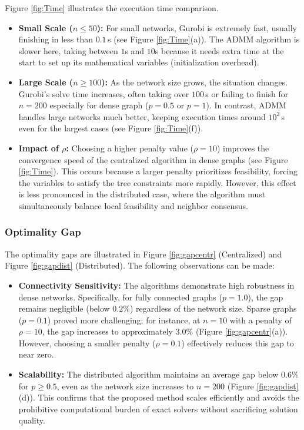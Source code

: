 \documentclass[11pt,a4paper]{article}
\theoremstyle{plain}
\theoremstyle{definition}
\theoremstyle{remark}
\begin{document}
	Figure \ref{fig:Time} illustrates the execution time comparison. 
	
	\begin{itemize}
		\item \textbf{Small Scale ($n \le 50$):} For small networks, \textsf{Gurobi} is extremely fast, usually finishing in less than $0.1$\,s (see Figure \ref{fig:Time}(a)). The ADMM algorithm is slower here, taking between $1$s and $10$s because it needs extra time at the start to set up its mathematical variables (initialization overhead).
		
		\item \textbf{Large Scale ($n \ge 100$):} As the network size grows, the situation changes. \textsf{Gurobi}'s solve time increases, often taking over $100$\,s or failing to finish for $n=200$ especially for dense graph ($p=0.5$ or $p=1$). In contrast, ADMM handles large networks much better, keeping execution times around $10^2$\,s even for the largest cases (see Figure \ref{fig:Time}(f)).
		
		\item \textbf{Impact of $\rho$:} Choosing a higher penalty value ($\rho=10$) improves the convergence speed of the centralized algorithm in dense graphs (see Figure \ref{fig:Time}). This occurs because a larger penalty prioritizes feasibility, forcing the variables to satisfy the tree constraints more rapidly. However, this effect is less pronounced in the distributed case, where the algorithm must simultaneously balance local feasibility and neighbor consensus.
	\end{itemize}
	\subsubsection*{Optimality Gap}
	
	The optimality gaps are illustrated in Figure \ref{fig:gapcentr} (Centralized) and Figure \ref{fig:gapdist} (Distributed). The following observations can be made:
	
	\begin{itemize}
		\item \textbf{Connectivity Sensitivity:} The algorithms demonstrate high robustness in dense networks. Specifically, for fully connected graphs ($p=1.0$), the gap remains negligible (below $0.2\%$) regardless of the network size. Sparse graphs ($p=0.1$) proved more challenging; for instance, at $n=10$ with a penalty of $\rho=10$, the gap increases to approximately $3.0\%$ (Figure \ref{fig:gapcentr}(a)). However, choosing a smaller penalty ($\rho=0.1$) effectively reduces this gap to near zero.
		
		\item \textbf{Scalability:} The distributed algorithm maintains an average gap below $0.6\%$ for $p \ge 0.5$, even as the network size increases to $n=200$ (Figure \ref{fig:gapdist}(d)). This confirms that the proposed method scales efficiently and avoids the prohibitive computational burden of exact solvers without sacrificing solution quality.
	\end{itemize}
	
\end{document}
